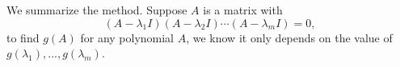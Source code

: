 
We summarize the method. Suppose $A$ is a matrix with 
$$(A-λ_1I)(A-λ_2I)\cdots(A-λ_mI)=0,$$
to find $g(A)$ for any polynomial $A$, we know it only depends on the value of $g(λ_1),...,g(λ_m)$. 


%
%
%
%
%
%
%
%
%

